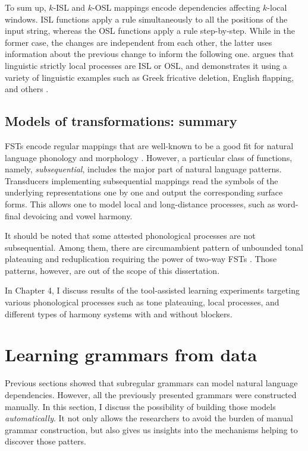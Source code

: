 To sum up, $k$-ISL and $k$-OSL mappings encode dependencies affecting $k$-local windows.
ISL functions apply a rule simultaneously to all the positions of the input string, whereas the OSL functions apply a rule step-by-step.
While in the former case, the changes are independent from each other, the latter uses information about the previous change to inform the following one.
\cite{Chandlee2014} argues that linguistic strictly local processes are ISL or OSL, and demonstrates it using a variety of linguistic examples such as Greek fricative deletion, English flapping, and others \citep{JosephPhilippakiWarburton1987}.




\subsection{Models of transformations: summary}


FSTs encode regular mappings that are well-known to be a good fit for natural language phonology and morphology \citep{Johnson1972,KaplanKay94,BeesleyKartunnen03}.
However, a particular class of functions, namely, \emph{subsequential}, includes the major part of natural language patterns.
Transducers implementing subsequential mappings read the symbols of the underlying representations one by one and output the corresponding surface forms.
This allows one to model local and long-distance processes, such as word-final devoicing and vowel harmony.

It should be noted that some attested phonological processes are not subsequential.
Among them, there are circumambient pattern of unbounded tonal plateauing and reduplication requiring the power of two-way FSTs \citep{Jardine2016,DolatianHeinz2018}.
Those patterns, however, are out of the scope of this dissertation.


In Chapter 4, I discuss results of the tool-assisted learning experiments targeting various phonological processes such as tone plateauing, local processes, and different types of harmony systems with and without blockers.





\section{Learning grammars from data}
\label{learningframework}


Previous sections showed that subregular grammars can model natural language dependencies.
However, all the previously presented grammars were constructed manually.
In this section, I discuss the possibility of building those models \emph{automatically}.
It not only allows the researchers to avoid the burden of manual grammar construction, but also gives us insights into the mechanisms helping to discover those patters.


